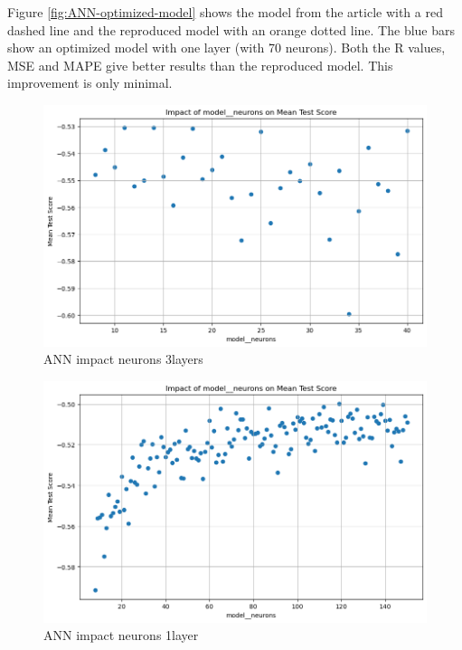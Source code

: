\documentclass{article}
\begin{document}
Figure \ref{fig:ANN-optimized-model} shows the model from the article with a red dashed line and the reproduced model with an orange dotted line. The blue bars show an optimized model with one layer (with 70 neurons). Both the R values, MSE and MAPE give better results than the reproduced model. This improvement is only minimal.


\begin{figure}
	\centering
	\includegraphics[width=\linewidth]{figures/ANN_impact_neurons_3layers.png}
	\caption{ANN impact neurons 3layers}
	\label{fig:ANN-impact-neurons-3layers}
\end{figure}

\begin{figure}
	\centering
	\includegraphics[width=\linewidth]{figures/ANN_impact_neurons_1layer.png}
	\caption{ANN impact neurons 1layer}
	\label{fig:ANN-impact-neurons-1layer}
\end{figure}
\end{document}
